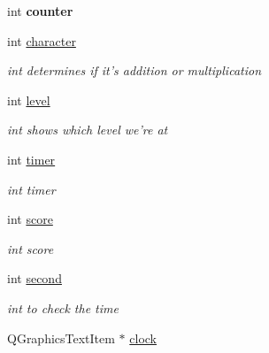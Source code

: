 \begin{DoxyCompactItemize}
\item 
\hypertarget{classgamemanager5_a13c4bb4b02fd76526ecc0c133aaa7e38}{int {\bfseries counter}}\label{classgamemanager5_a13c4bb4b02fd76526ecc0c133aaa7e38}

\item 
\hypertarget{classgamemanager5_acc4a21dc14658ad2cc9d8848fb88f375}{int \hyperlink{classgamemanager5_acc4a21dc14658ad2cc9d8848fb88f375}{character}}\label{classgamemanager5_acc4a21dc14658ad2cc9d8848fb88f375}

\begin{DoxyCompactList}\small\item\em int determines if it's addition or multiplication \end{DoxyCompactList}\item 
\hypertarget{classgamemanager5_a67c82306ab6f2f18bd8207437e668638}{int \hyperlink{classgamemanager5_a67c82306ab6f2f18bd8207437e668638}{level}}\label{classgamemanager5_a67c82306ab6f2f18bd8207437e668638}

\begin{DoxyCompactList}\small\item\em int shows which level we're at \end{DoxyCompactList}\item 
\hypertarget{classgamemanager5_ad2f3d331baee197ae891dc229d203c3c}{int \hyperlink{classgamemanager5_ad2f3d331baee197ae891dc229d203c3c}{timer}}\label{classgamemanager5_ad2f3d331baee197ae891dc229d203c3c}

\begin{DoxyCompactList}\small\item\em int timer \end{DoxyCompactList}\item 
\hypertarget{classgamemanager5_a3e6cfbb815b5db771e59cb69c79e39f1}{int \hyperlink{classgamemanager5_a3e6cfbb815b5db771e59cb69c79e39f1}{score}}\label{classgamemanager5_a3e6cfbb815b5db771e59cb69c79e39f1}

\begin{DoxyCompactList}\small\item\em int score \end{DoxyCompactList}\item 
\hypertarget{classgamemanager5_a5ea2dd64e283d5a0dfefa193801d0d32}{int \hyperlink{classgamemanager5_a5ea2dd64e283d5a0dfefa193801d0d32}{second}}\label{classgamemanager5_a5ea2dd64e283d5a0dfefa193801d0d32}

\begin{DoxyCompactList}\small\item\em int to check the time \end{DoxyCompactList}\item 
\hypertarget{classgamemanager5_a0ba3a95d628ea502b2def23fb9a2f120}{\-Q\-Graphics\-Text\-Item $\ast$ \hyperlink{classgamemanager5_a0ba3a95d628ea502b2def23fb9a2f120}{clock}}\label{classgamemanager5_a0ba3a95d628ea502b2def23fb9a2f120}


\end{DoxyCompactItemize}
